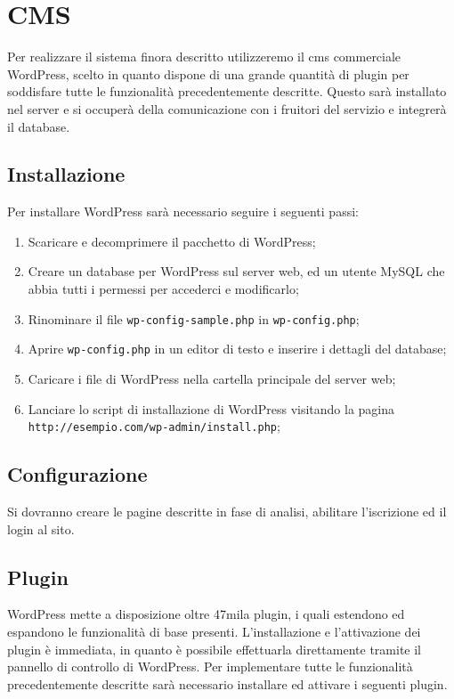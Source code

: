 \section{CMS}
Per realizzare il sistema finora descritto utilizzeremo il \gls{cms} commerciale WordPress, scelto in quanto dispone di una grande quantità di plugin per soddisfare tutte le funzionalità precedentemente descritte. Questo sarà installato nel server e si occuperà della comunicazione con i fruitori del servizio e integrerà il database.

\subsection{Installazione}
Per installare WordPress sarà necessario seguire i seguenti passi:
\begin{enumerate}
	\item Scaricare e decomprimere il pacchetto di WordPress;
	\item Creare un database per WordPress sul server web, ed un utente MySQL che abbia tutti i permessi per accederci e modificarlo;
	\item Rinominare il file \texttt{wp-config-sample.php} in \texttt{wp-config.php};
	\item Aprire \texttt{wp-config.php} in un editor di testo e inserire i dettagli del database;
	\item Caricare i file di WordPress nella cartella principale del server web;
	\item Lanciare lo script di installazione di WordPress visitando la pagina \texttt{http://esempio.com/wp-admin/install.php};
\end{enumerate}

\subsection{Configurazione}
Si dovranno creare le pagine descritte in fase di analisi, abilitare l'iscrizione ed il login al sito.

\subsection{Plugin}
WordPress mette a disposizione oltre 47mila plugin, i quali estendono ed espandono le funzionalità di base presenti.
L'installazione e l'attivazione dei plugin è immediata, in quanto è possibile effettuarla direttamente tramite il pannello di controllo di WordPress.
Per implementare tutte le funzionalità precedentemente descritte sarà necessario installare ed attivare i seguenti plugin.

